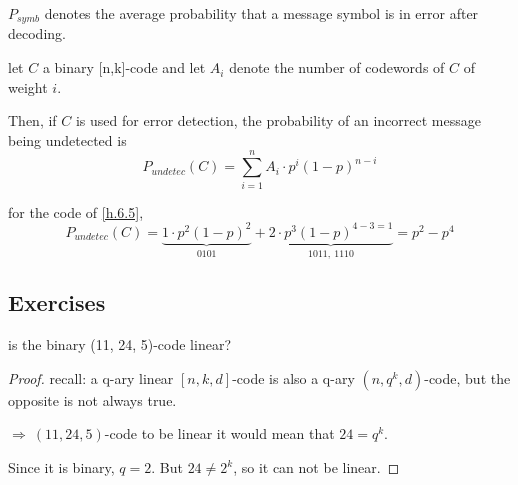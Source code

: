 \documentclass{article}
\theoremstyle{definition}
\newenvironment{defn}[1]
{\renewcommand\theinnerdefn{#1}\innerdefn}
{\endinnerdefn}
\newenvironment{thm}[1]
{\renewcommand\theinnerthm{#1}\innerthm}
{\endinnerthm}
\newenvironment{eg}[1]
{\renewcommand\theinnereg{#1}\innereg}
{\endinnereg}
\newenvironment{ex}[1]
{\renewcommand\theinnerex{#1}\innerex}
{\endinnerex}
\begin{document}
\begin{defn}{}[$P_{symb}$]
  $P_{symb}$ denotes the average probability that a message symbol is in error after decoding.
\end{defn}

\begin{thm}{6.14}
  let $C$ a binary [n,k]-code and let $A_i$ denote the number of codewords of $C$ of weight $i$.

  Then, if $C$ is used for error detection, the probability of an incorrect message being undetected is
  $$P_{undetec}(C) = \sum_{i=1}^n A_i \cdot p^i (1-p)^{n-i}$$
\end{thm}

\begin{eg}{6.15}
  for the code of \ref{h.6.5},
  $$P_{undetec}(C) = \underbrace{1 \cdot p^2 (1-p)^2}_{0101} + \underbrace{2 \cdot p^3(1-p)^{4-3=1} }_{1011,~1110}= p^2 -p^4$$
\end{eg}



\vspace{0.5cm}

\subsection{Exercises}
\begin{ex}{5.1}
  is the binary (11, 24, 5)-code linear?
\end{ex}
\begin{proof}
  recall: a q-ary linear $[n,k,d]$-code is also a q-ary $(n, q^k, d)$-code, but
  the opposite is not always true.

  $\Longrightarrow~ (11, 24, 5)$-code to be linear it would mean that $24=q^k$.

  Since it is binary, $q=2$. But $24 \neq 2^k$, so it can not be linear.
\end{proof}
\end{document}
